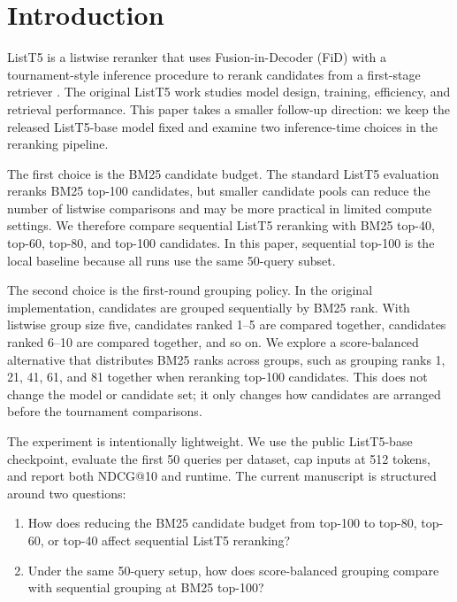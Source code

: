 \section{Introduction}
\label{sec:introduction}

ListT5 is a listwise reranker that uses Fusion-in-Decoder (FiD) with a tournament-style inference procedure to rerank candidates from a first-stage retriever \citep{yoon2024listt5}.
The original ListT5 work studies model design, training, efficiency, and retrieval performance.
This paper takes a smaller follow-up direction: we keep the released ListT5-base model fixed and examine two inference-time choices in the reranking pipeline.

The first choice is the BM25 candidate budget.
The standard ListT5 evaluation reranks BM25 top-100 candidates, but smaller candidate pools can reduce the number of listwise comparisons and may be more practical in limited compute settings.
We therefore compare sequential ListT5 reranking with BM25 top-40, top-60, top-80, and top-100 candidates.
In this paper, sequential top-100 is the local baseline because all runs use the same 50-query subset.

The second choice is the first-round grouping policy.
In the original implementation, candidates are grouped sequentially by BM25 rank.
With listwise group size five, candidates ranked 1--5 are compared together, candidates ranked 6--10 are compared together, and so on.
We explore a score-balanced alternative that distributes BM25 ranks across groups, such as grouping ranks 1, 21, 41, 61, and 81 together when reranking top-100 candidates.
This does not change the model or candidate set; it only changes how candidates are arranged before the tournament comparisons.

The experiment is intentionally lightweight.
We use the public ListT5-base checkpoint, evaluate the first 50 queries per dataset, cap inputs at 512 tokens, and report both NDCG@10 and runtime.
The current manuscript is structured around two questions:

\begin{enumerate}
  \item How does reducing the BM25 candidate budget from top-100 to top-80, top-60, or top-40 affect sequential ListT5 reranking?
  \item Under the same 50-query setup, how does score-balanced grouping compare with sequential grouping at BM25 top-100?
\end{enumerate}
